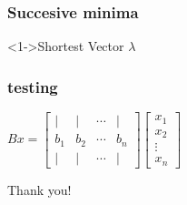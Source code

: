 \documentclass{beamer}
\begin{document}
\begin{frame}
    \frametitle{Succesive minima}
    \begin{block}<1->{Shortest Vector}
        $\lambda$
    \end{block}
\end{frame}
\begin{frame}
    \frametitle{testing}
    \begin{center}
    $Bx = 
      \begin{bmatrix}
            | & | & \cdots & |\\
            b_1 & b_2 & \cdots & b_n \\
            | & | & \cdots & |
     \end{bmatrix}
     \begin{bmatrix}
        x_1\\
        x_2\\
        \vdots \\
        x_n 
    \end{bmatrix}$
    \end{center}
\end{frame}


\begin{frame}
\Huge{\centerline{Thank you!}}
\end{frame}
\end{document}
